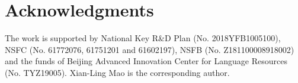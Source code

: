 \documentclass[10pt, conference, compsocconf]{IEEEtran}
\begin{document}
\section*{Acknowledgments}
The work is supported by National Key R\&D Plan (No. 2018YFB1005100), 
NSFC (No. 61772076, 61751201 and 61602197), NSFB (No. Z181100008918002) 
and the funds of Beijing Advanced Innovation Center for Language Resources (No. TYZ19005).
Xian-Ling Mao is the corresponding author.



\end{document}

